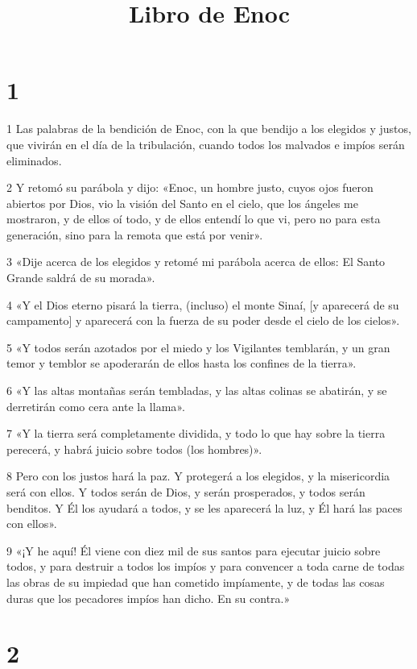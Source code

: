 

\title{Libro de Enoc}


\chapter{1}

\par 1 Las palabras de la bendición de Enoc, con la que bendijo a los elegidos y justos, que vivirán en el día de la tribulación, cuando todos los malvados e impíos serán eliminados.
\par 2 Y retomó su parábola y dijo: «Enoc, un hombre justo, cuyos ojos fueron abiertos por Dios, vio la visión del Santo en el cielo, que los ángeles me mostraron, y de ellos oí todo, y de ellos entendí lo que vi, pero no para esta generación, sino para la remota que está por venir».
\par 3 «Dije acerca de los elegidos y retomé mi parábola acerca de ellos: El Santo Grande saldrá de su morada».
\par 4 «Y el Dios eterno pisará la tierra, (incluso) el monte Sinaí, [y aparecerá de su campamento] y aparecerá con la fuerza de su poder desde el cielo de los cielos».
\par 5 «Y todos serán azotados por el miedo y los Vigilantes temblarán, y un gran temor y temblor se apoderarán de ellos hasta los confines de la tierra».
\par 6 «Y las altas montañas serán tembladas, y las altas colinas se abatirán, y se derretirán como cera ante la llama».
\par 7 «Y la tierra será completamente dividida, y todo lo que hay sobre la tierra perecerá, y habrá juicio sobre todos (los hombres)».
\par 8 Pero con los justos hará la paz. Y protegerá a los elegidos, y la misericordia será con ellos. Y todos serán de Dios, y serán prosperados, y todos serán benditos. Y Él los ayudará a todos, y se les aparecerá la luz, y Él hará las paces con ellos».
\par 9 «¡Y he aquí! Él viene con diez mil de sus santos para ejecutar juicio sobre todos, y para destruir a todos los impíos y para convencer a toda carne de todas las obras de su impiedad que han cometido impíamente, y de todas las cosas duras que los pecadores impíos han dicho. En su contra.»

\chapter{2}

